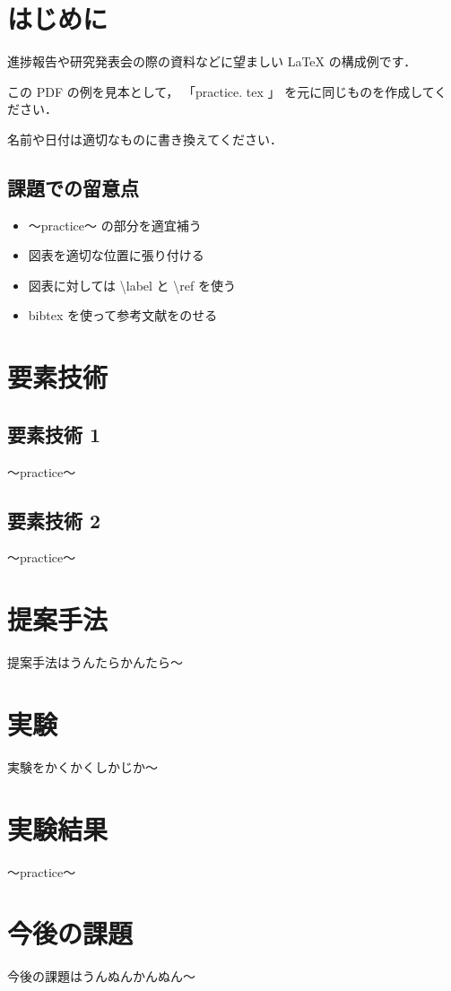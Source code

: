 \documentclass[twocolumn]{jarticle}     %
\begin{document}

\section{はじめに}
進捗報告や研究発表会の際の資料などに望ましい LaTeX の構成例です．

この PDF の例を見本として， 「practice. tex 」 を元に同じものを作成してください．

名前や日付は適切なものに書き換えてください．

\subsection{課題での留意点}
\begin{itemize}

\item 〜practice〜 の部分を適宜補う
\item 図表を適切な位置に張り付ける
\item 図表に対しては \textbackslash label と \textbackslash ref を使う
\item bibtex を使って参考文献をのせる
\end{itemize}

\section{要素技術}

\subsection{要素技術 1 }
〜practice〜 

\subsection{要素技術 2 }
〜practice〜 

\section{提案手法}
提案手法はうんたらかんたら〜

\section{実験}
実験をかくかくしかじか〜

\section{実験結果}
〜practice〜 

\section{今後の課題}
今後の課題はうんぬんかんぬん〜


\end{document}
